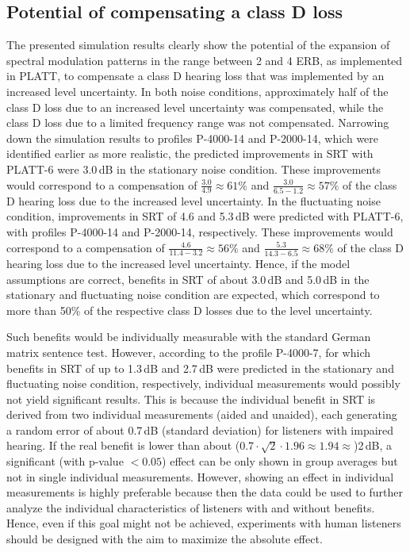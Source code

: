 \documentclass[10pt,a4paper,twocolumn]{article}
\begin{document}
\subsection*{Potential of compensating a class D loss}
%
The presented simulation results clearly show the potential of the expansion of spectral modulation patterns in the range between 2 and 4 ERB, as implemented in PLATT, to compensate a class D hearing loss that was implemented by an increased level uncertainty.
%
In both noise conditions, approximately half of the class D loss due to an increased level uncertainty was compensated, while the class D loss due to a limited frequency range was not compensated.
%
Narrowing down the simulation results to profiles P-4000-14 and P-2000-14, which were identified earlier as more realistic, the predicted improvements in SRT with PLATT-6 were 3.0\,dB in the stationary noise condition.
%
These improvements would correspond to a compensation of $\frac{3.0}{4.9}\approx61\%$ and $\frac{3.0}{6.5-1.2}\approx57\%$ of the class D hearing loss due to the increased level uncertainty.
%
In the fluctuating noise condition, improvements in SRT of 4.6 and 5.3\,dB were predicted with PLATT-6, with profiles P-4000-14 and P-2000-14, respectively.
%
These improvements would correspond to a compensation of $\frac{4.6}{11.4-3.2}\approx56\%$ and $\frac{5.3}{14.3-6.5}\approx68\%$ of the class D hearing loss due to the increased level uncertainty.
%
Hence, if the model assumptions are correct, benefits in SRT of about 3.0\,dB and 5.0\,dB in the stationary and fluctuating noise condition are expected, which correspond to more than 50\% of the respective class D losses due to the level uncertainty.

Such benefits would be individually measurable with the standard German matrix sentence test.
%
However, according to the profile P-4000-7, for which benefits in SRT of up to 1.3\,dB and 2.7\,dB were predicted in the stationary and fluctuating noise condition, respectively, individual measurements would possibly not yield significant results.
%
This is because the individual benefit in SRT is derived from two individual measurements (aided and unaided), each generating a random error of about 0.7\,dB (standard deviation) for listeners with impaired hearing.
%
If the real benefit is lower than about ($0.7\cdot\sqrt{2}\cdot1.96\approx1.94\approx$)2\,dB, a significant (with p-value $<0.05$) effect can be only shown in group averages but not in single individual measurements.
%
However, showing an effect in individual measurements is highly preferable because then the data could be used to further analyze the individual characteristics of listeners with and without benefits.
%
Hence, even if this goal might not be achieved, experiments with human listeners should be designed with the aim to maximize the absolute effect.
\end{document}
